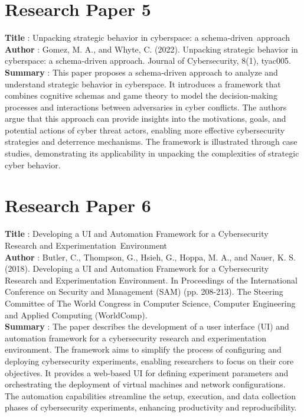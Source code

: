 \section{Research Paper 5}
\textbf{Title} : Unpacking strategic behavior in cyberspace: a schema-driven approach
\\
\textbf{Author} : Gomez, M. A., and Whyte, C. (2022). Unpacking strategic behavior in cyberspace: a schema-driven approach. Journal of Cybersecurity, 8(1), tyac005.
\\
\textbf{Summary} : This paper proposes a schema-driven approach to analyze and understand strategic behavior in cyberspace. It introduces a framework that combines cognitive schemas and game theory to model the decision-making processes and interactions between adversaries in cyber conflicts. The authors argue that this approach can provide insights into the motivations, goals, and potential actions of cyber threat actors, enabling more effective cybersecurity strategies and deterrence mechanisms. The framework is illustrated through case studies, demonstrating its applicability in unpacking the complexities of strategic cyber behavior.

\section{Research Paper 6}
\textbf{Title} : Developing a UI and Automation Framework for a Cybersecurity Research and Experimentation Environment
\\
\textbf{Author} : Butler, C., Thompson, G., Hsieh, G., Hoppa, M. A., and Nauer, K. S. (2018). Developing a UI and Automation Framework for a Cybersecurity Research and Experimentation Environment. In Proceedings of the International Conference on Security and Management (SAM) (pp. 208-213). The Steering Committee of The World Congress in Computer Science, Computer Engineering and Applied Computing (WorldComp).
\\
\textbf{Summary} : The paper describes the development of a user interface (UI) and automation framework for a cybersecurity research and experimentation environment. The framework aims to simplify the process of configuring and deploying cybersecurity experiments, enabling researchers to focus on their core objectives. It provides a web-based UI for defining experiment parameters and orchestrating the deployment of virtual machines and network configurations. The automation capabilities streamline the setup, execution, and data collection phases of cybersecurity experiments, enhancing productivity and reproducibility.

